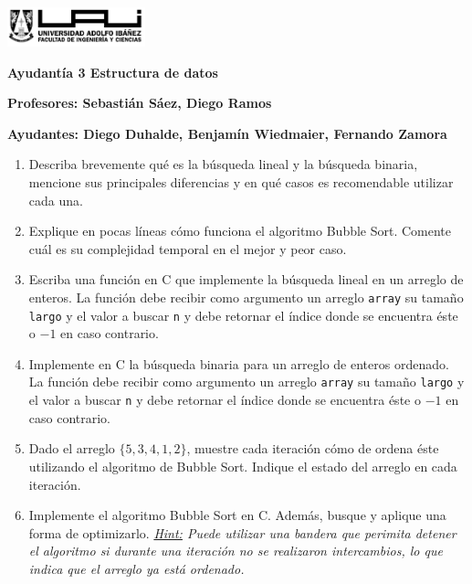 \documentclass[12pt]{article}
\begin{document}
    \begin{titlepage}
        \centering
        \includegraphics[width=0.3\textwidth]{../imgs/logo-uai-fic.png}
        
        \vspace{0.5cm}
        \textbf{\fontsize{12}{24} Ayudantía 3 Estructura de datos}
        
        \vspace{0.5cm}
        \textbf{\fontsize{12}{24}\selectfont Profesores: Sebastián Sáez, Diego Ramos}
        
        \begin{center}
            \textbf{\fontsize{12}{24}\selectfont Ayudantes: Diego Duhalde, Benjamín Wiedmaier, Fernando Zamora}
        \end{center}

        \begin{enumerate}
            \item Describa brevemente qué es la búsqueda lineal y la búsqueda binaria, mencione sus principales diferencias y en qué casos es recomendable utilizar cada una.
            
            \item Explique en pocas líneas cómo funciona el algoritmo Bubble Sort. Comente cuál es su complejidad temporal en el mejor y peor caso.
            
            \item Escriba una función en C que implemente la búsqueda lineal en un arreglo de enteros. La función debe recibir como argumento un arreglo \lstinline[language=C]|array| su tamaño \lstinline[language=C]|largo| y el valor a buscar \lstinline[language=C]|n| y debe retornar el índice donde se encuentra éste o $-1$ en caso contrario.
            
            \item Implemente en C la búsqueda binaria para un arreglo de enteros ordenado. La función debe recibir como argumento un arreglo \lstinline[language=C]|array| su tamaño \lstinline[language=C]|largo| y el valor a buscar \lstinline[language=C]|n|  y debe retornar el índice donde se encuentra éste o $-1$ en caso contrario.
            
            \item Dado el arreglo $\{ 5, 3, 4, 1, 2 \}$, muestre cada iteración cómo de ordena éste utilizando el algoritmo de Bubble Sort. Indique el estado del arreglo en cada iteración.
            
            \item Implemente el algoritmo Bubble Sort en C. Además, busque y aplique una forma de optimizarlo. \textit{\underline{Hint:} Puede utilizar una bandera que perimita detener el algoritmo si durante una iteración no se realizaron intercambios, lo que indica que el arreglo ya está ordenado.}
        \end{enumerate}
    \end{titlepage}
\end{document}
